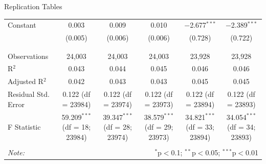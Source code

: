\documentclass{beamer}
\begin{document}
\begin{frame}{Replication Tables}
\begin{table}[!htbp]
{\begin{tabular}{@{\extracolsep{5pt}}lccccc}
 Constant & 0.003 & 0.009 & 0.010 & $-$2.677$^{***}$ & $-$2.389$^{***}$ \\ 
  & (0.005) & (0.006) & (0.006) & (0.728) & (0.722) \\ 
  & & & & & \\ 
\hline \\[-1.8ex] 
Observations & 24,003 & 24,003 & 24,003 & 23,928 & 23,928 \\ 
R$^{2}$ & 0.043 & 0.044 & 0.045 & 0.046 & 0.046 \\ 
Adjusted R$^{2}$ & 0.042 & 0.043 & 0.043 & 0.045 & 0.045 \\ 
Residual Std. Error & 0.122 (df = 23984) & 0.122 (df = 23974) & 0.122 (df = 23973) & 0.122 (df = 23894) & 0.122 (df = 23893) \\ 
F Statistic & 59.209$^{***}$ (df = 18; 23984) & 39.347$^{***}$ (df = 28; 23974) & 38.579$^{***}$ (df = 29; 23973) & 34.821$^{***}$ (df = 33; 23894) & 34.054$^{***}$ (df = 34; 23893) \\ 
\endrule
\hline 
\hline \\[-1.8ex] 
\textit{Note:}  & \multicolumn{5}{r}{$^{*}$p$<$0.1; $^{**}$p$<$0.05; $^{***}$p$<$0.01} \\ 
\end{tabular} }
\end{table} 

\end{frame}
\end{document}
